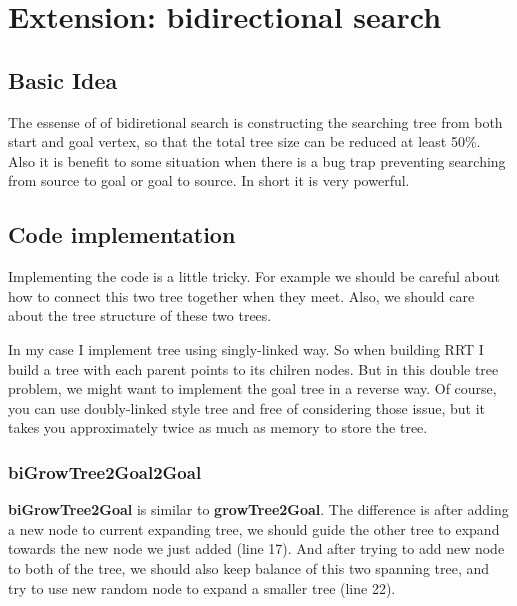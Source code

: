 \documentclass{article}
\begin{document}
\clearpage
\section{Extension: bidirectional search}
\subsection{Basic Idea}
The essense of of bidiretional search is constructing the searching tree from both start and goal vertex, so that the total tree size can be reduced at least 50\%. Also it is benefit to some situation when there is a bug trap preventing searching from source to goal or goal to source. In short it is very powerful.

\subsection{Code implementation}

Implementing the code is a little tricky. For example we should be careful about how to connect this two tree together when they meet. Also, we should care about the tree structure of these two trees. 

In my case I implement tree using singly-linked way. So when building RRT I build a tree with each parent points to its chilren nodes. But in this double tree problem, we might want to implement the goal tree in a reverse way. Of course, you can use doubly-linked style tree and free of considering those issue, but it takes you approximately twice as much as memory to store the tree.

\subsubsection{biGrowTree2Goal2Goal}


\textbf{biGrowTree2Goal} is similar to \textbf{growTree2Goal}. The difference is after adding a new node to current expanding tree, we should guide the other tree to expand towards the new node we just added (line 17). And after trying to add new node to both of the tree, we should also keep balance of this two spanning tree, and try to use new random node to expand a smaller tree (line 22).
\end{document}
